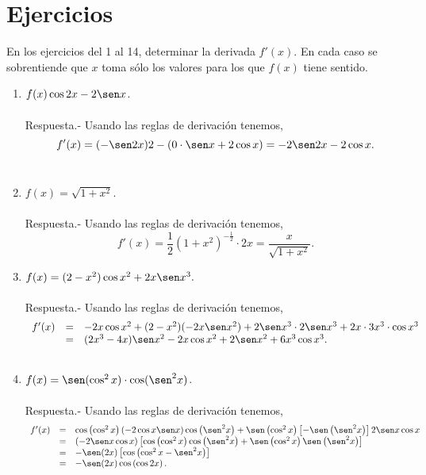 \section{Ejercicios}
En los ejercicios del 1 al 14, determinar la derivada $f'(x)$. En cada caso se sobrentiende que $x$ toma sólo los valores para los que $f(x)$ tiene sentido.

\begin{enumerate}[\bfseries 1.]

    \item $f(x)\cos 2x-2\sen x$.\\\\
	Respuesta.-\; Usando las reglas de derivación tenemos,
	$$f'(x)=(-\sen 2x )2-\left(0\cdot \sen x + 2\cos x\right) = -2\sen 2x-2\cos x.$$\\

    \item $f(x)=\sqrt{1+x^2}$.\\\\
	Respuesta.-\; Usando las reglas de derivación tenemos,
	$$f'(x)=\dfrac{1}{2}(1+x^2)^{-\frac{1}{2}}\cdot 2x = \dfrac{x}{\sqrt{1+x^2}}.$$

    \item $f(x)=(2-x^2)\cos x^2+2x\sen x^3.$\\\\
	Respuesta.-\; Usando las reglas de derivación tenemos,
	$$\begin{array}{rcl}
	    f'(x)&=&-2x\cos x^2+(2-x^2)(-2x\sen x^2)+2\sen x^3 \cdot 2\sen x^3+2x\cdot 3x^3\cdot \cos x^3\\
		 &=&(2x^3-4x)\sen x^2 - 2x \cos x^2 + 2\sen x^2 + 6x^3\cos x^3.\\\\
	\end{array}$$

    \item $f(x)=\sen (\cos^2 x)\cdot \cos (\sen^2 x)$.\\\\
	Respuesta.-\; Usando las reglas de derivación tenemos,
	$$\begin{array}{rcl}
	    f'(x)&=&\cos\left(\cos^2 x\right)\left(-2\cos x \sen x\right)\cos\left(\sen^2 x\right)+\sen\left(\cos^2 x\right)\left[-\sen\left(\sen^2 x\right)\right]2\sen x \cos x\\
		 &=&\left(-2\sen x \cos x\right)\left[\cos\left(\cos^2 x\right)\cos\left(\sen^2 x\right)+\sen \left(\cos^2 x\right)\sen \left(\sen^2 x\right)\right]\\
		 &=&-\sen(2x)\left[\cos \left(\cos^2 x - \sen^2 x\right)\right]\\
		 &=&-\sen(2x)\cos\left(\cos 2 x\right).\\\\
	\end{array}$$



\end{enumerate}
